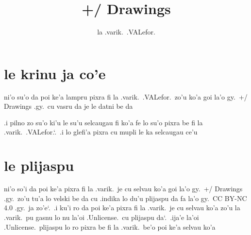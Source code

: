\documentclass{report}
\title{+/ Drawings}
\author{la .varik.\ .VALefor.}
\newcommand\sds{\spacefactor\sfcode`.\ \space}
\begin{document}
\maketitle{}
\tableofcontents{}
\chapter{le krinu ja co'e}
ni'o su'o da poi ke'a lampru pixra fi la .varik.\ .VALefor.\ zo'u ko'a goi la'o gy.\ +/ Drawings .gy.\ cu vasru da je le datni be da

.i pilno zo su'o ki'u le su'u selcaugau fi ko'a fe lo su'o pixra be fi la .varik.\ .VALefor.\sds .i lo glefi'a pixra cu mupli le ka selcaugau ce'u

\chapter{le plijaspu}
ni'o so'i da poi ke'a pixra fi la .varik.\ je cu selvau ko'a goi la'o gy.\ +/ Drawings .gy.\ zo'u tu'a lo velski be da cu .indika lo du'u plijaspu da fa la'o gy.\ CC BY-NC 4.0 .gy.\ ja zo'e\sds  .i ku'i ro da poi ke'a pixra fi la .varik.\ je cu selvau ko'a zo'u la .varik.\ pu gasnu lo nu la'oi .Unlicense.\ cu plijaspu da\sds  .ija'e la'oi .Unlicense.\ plijaspu lo ro pixra be fi la .varik.\ be'o poi ke'a selvau ko'a
\end{document}
